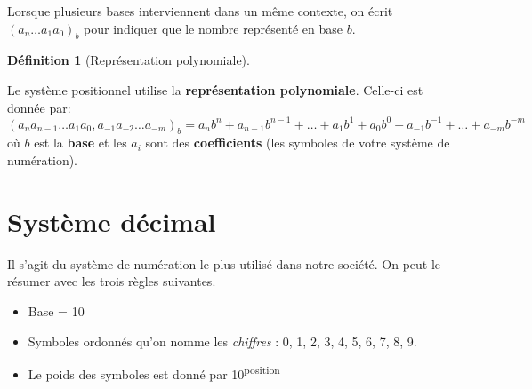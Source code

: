 \documentclass[
  letterpaper,
]{scrbook}
\providecommand{\tightlist}{%
  \setlength{\itemsep}{0pt}\setlength{\parskip}{0pt}}\usepackage{longtable,booktabs,array}
\theoremstyle{definition}
\theoremstyle{definition}
\newtheorem{definition}{Définition}[chapter]
\theoremstyle{plain}
\theoremstyle{remark}
\begin{document}
\begin{tcolorbox}[enhanced jigsaw, colframe=quarto-callout-note-color-frame, bottomtitle=1mm, coltitle=black, breakable, arc=.35mm, title=\textcolor{quarto-callout-note-color}{\faInfo}\hspace{0.5em}{Note}, opacitybacktitle=0.6, colback=white, opacityback=0, colbacktitle=quarto-callout-note-color!10!white, leftrule=.75mm, rightrule=.15mm, titlerule=0mm, toprule=.15mm, toptitle=1mm, left=2mm, bottomrule=.15mm]

Lorsque plusieurs bases interviennent dans un même contexte, on écrit
\((a_n \ldots a_1a_0)_b\) pour indiquer que le nombre représenté en base
\(b\).

\end{tcolorbox}

\leavevmode{}%
\begin{definition}[Représentation
polynomiale]\label{def-representation-polynomiale}

Le système positionnel utilise la \textbf{représentation polynomiale}.
Celle-ci est donnée par: \[
(a_na_{n-1}\ldots a_1a_0,a_{-1}a_{-2}\ldots a_{-m})_b = a_nb^n+a_{n-1}b^{n-1}+\ldots +a_1b^1+a_0b^0+a_{-1}b^{-1}+\ldots +a_{-m}b^{-m}
\] où \(b\) est la \textbf{base} et les \(a_i\) sont des
\textbf{coefficients} (les symboles de votre système de numération).

\end{definition}

\hypertarget{systuxe8me-duxe9cimal}{%
\section{Système décimal}\label{systuxe8me-duxe9cimal}}

Il s'agit du système de numération le plus utilisé dans notre société.
On peut le résumer avec les trois règles suivantes.

\begin{itemize}
\tightlist
\item
  Base = 10
\item
  Symboles ordonnés qu'on nomme les \emph{chiffres} : 0, 1, 2, 3, 4, 5,
  6, 7, 8, 9.
\item
  Le poids des symboles est donné par 10\textsuperscript{position}
\end{itemize}
\end{document}
